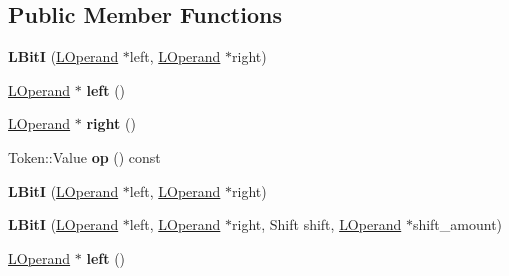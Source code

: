 \subsection*{Public Member Functions}
\begin{DoxyCompactItemize}
\item 
{\bfseries L\+BitI} (\hyperlink{classv8_1_1internal_1_1_l_operand}{L\+Operand} $\ast$left, \hyperlink{classv8_1_1internal_1_1_l_operand}{L\+Operand} $\ast$right)\hypertarget{classv8_1_1internal_1_1_l_bit_i_a7addbe12befa5af0406b826a586ceb2e}{}\label{classv8_1_1internal_1_1_l_bit_i_a7addbe12befa5af0406b826a586ceb2e}

\item 
\hyperlink{classv8_1_1internal_1_1_l_operand}{L\+Operand} $\ast$ {\bfseries left} ()\hypertarget{classv8_1_1internal_1_1_l_bit_i_aea887d4a21d05d215da0afcc732cd738}{}\label{classv8_1_1internal_1_1_l_bit_i_aea887d4a21d05d215da0afcc732cd738}

\item 
\hyperlink{classv8_1_1internal_1_1_l_operand}{L\+Operand} $\ast$ {\bfseries right} ()\hypertarget{classv8_1_1internal_1_1_l_bit_i_a529407f53b9e7af46b4349acc8ad7343}{}\label{classv8_1_1internal_1_1_l_bit_i_a529407f53b9e7af46b4349acc8ad7343}

\item 
Token\+::\+Value {\bfseries op} () const \hypertarget{classv8_1_1internal_1_1_l_bit_i_ae5d5381d55b904894bf5da5a561ee586}{}\label{classv8_1_1internal_1_1_l_bit_i_ae5d5381d55b904894bf5da5a561ee586}

\item 
{\bfseries L\+BitI} (\hyperlink{classv8_1_1internal_1_1_l_operand}{L\+Operand} $\ast$left, \hyperlink{classv8_1_1internal_1_1_l_operand}{L\+Operand} $\ast$right)\hypertarget{classv8_1_1internal_1_1_l_bit_i_a7addbe12befa5af0406b826a586ceb2e}{}\label{classv8_1_1internal_1_1_l_bit_i_a7addbe12befa5af0406b826a586ceb2e}

\item 
{\bfseries L\+BitI} (\hyperlink{classv8_1_1internal_1_1_l_operand}{L\+Operand} $\ast$left, \hyperlink{classv8_1_1internal_1_1_l_operand}{L\+Operand} $\ast$right, Shift shift, \hyperlink{classv8_1_1internal_1_1_l_operand}{L\+Operand} $\ast$shift\+\_\+amount)\hypertarget{classv8_1_1internal_1_1_l_bit_i_a7ee981cddefa210023349f3c6f8b9687}{}\label{classv8_1_1internal_1_1_l_bit_i_a7ee981cddefa210023349f3c6f8b9687}

\item 
\hyperlink{classv8_1_1internal_1_1_l_operand}{L\+Operand} $\ast$ {\bfseries left} ()\hypertarget{classv8_1_1internal_1_1_l_bit_i_aea887d4a21d05d215da0afcc732cd738}{}\label{classv8_1_1internal_1_1_l_bit_i_aea887d4a21d05d215da0afcc732cd738}


\end{DoxyCompactItemize}
